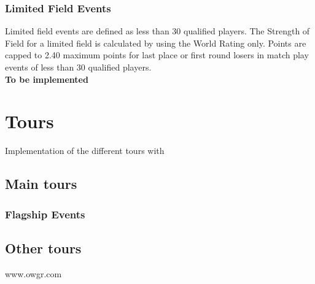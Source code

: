 \documentclass{article}
\begin{document}
\subsubsection{Limited Field Events}

Limited field events are defined as less than 30 qualified players. The Strength of Field for a limited field is calculated by using the World Rating only. Points are capped to 2.40 maximum points for last place or first round losers in match play events of less than 30 qualified players.\\
\textbf{\color{orange} To be implemented}

\clearpage

\section{Tours}

Implementation of the different tours with

\subsection{Main tours}
\subsubsection{Flagship Events}
\subsection{Other tours}


\begin{thebibliography}{9}
	 www.owgr.com%
\end{thebibliography}
\end{document}
